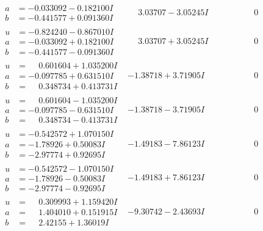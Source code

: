 \documentclass[1p]{elsarticle_modified}
\theoremstyle{definition}
\begin{document}
$$\begin{array}{c|c|c}
\begin{aligned}
a &= -0.033092 - 0.182100 I \\
b &= -0.441577 + 0.091360 I\end{aligned}
 & \phantom{-}3.03707 - 3.05245 I & \phantom{-0.000000 } 0 \\ \hline\begin{aligned}
u &= -0.824240 - 0.867010 I \\
a &= -0.033092 + 0.182100 I \\
b &= -0.441577 - 0.091360 I\end{aligned}
 & \phantom{-}3.03707 + 3.05245 I & \phantom{-0.000000 } 0 \\ \hline\begin{aligned}
u &= \phantom{-}0.601604 + 1.035200 I \\
a &= -0.097785 + 0.631510 I \\
b &= \phantom{-}0.348734 + 0.413731 I\end{aligned}
 & -1.38718 + 3.71905 I & \phantom{-0.000000 } 0 \\ \hline\begin{aligned}
u &= \phantom{-}0.601604 - 1.035200 I \\
a &= -0.097785 - 0.631510 I \\
b &= \phantom{-}0.348734 - 0.413731 I\end{aligned}
 & -1.38718 - 3.71905 I & \phantom{-0.000000 } 0 \\ \hline\begin{aligned}
u &= -0.542572 + 1.070150 I \\
a &= -1.78926 + 0.50083 I \\
b &= -2.97774 + 0.92695 I\end{aligned}
 & -1.49183 - 7.86123 I & \phantom{-0.000000 } 0 \\ \hline\begin{aligned}
u &= -0.542572 - 1.070150 I \\
a &= -1.78926 - 0.50083 I \\
b &= -2.97774 - 0.92695 I\end{aligned}
 & -1.49183 + 7.86123 I & \phantom{-0.000000 } 0 \\ \hline\begin{aligned}
u &= \phantom{-}0.309993 + 1.159420 I \\
a &= \phantom{-}1.404010 + 0.151915 I \\
b &= \phantom{-}2.42155 + 1.36019 I\end{aligned}
 & -9.30742 - 2.43693 I & \phantom{-0.000000 } 0 \\ \hline\begin{aligned}

\end{aligned}
\end{array}$$
\end{document}
